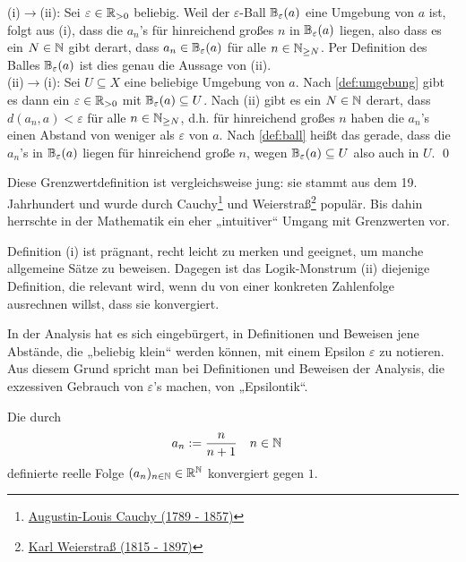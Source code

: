 \begin{bew}[*]
    (i)$\to$(ii): Sei $\varepsilon\in \mathbb R_{> 0}$ beliebig. Weil der $\varepsilon$-Ball $\mathbb B_\varepsilon(a)$ eine Umgebung von $a$ ist, folgt aus (i), dass die $a_n$'s für hinreichend großes $n$ in $\mathbb B_\varepsilon(a)$ liegen, also dass es ein $N\in \mathbb N$ gibt derart, dass $a_n\in \mathbb B_\varepsilon(a)$ für alle $n\in \mathbb N_{\ge N}$. Per Definition des Balles $\mathbb B_\varepsilon(a)$ ist dies genau die Aussage von (ii). \\[0.5em]
    (ii)$\to$(i): Sei $U\subseteq X$ eine beliebige Umgebung von $a$. Nach \cref{def:umgebung} gibt es dann ein $\varepsilon\in \mathbb R_{>0}$ mit $\mathbb B_\varepsilon(a)\subseteq U$. Nach (ii) gibt es ein $N\in \mathbb N$ derart, dass $d(a_n,a)<\varepsilon$ für alle $n\in \mathbb N_{\ge N}$, d.h. für hinreichend großes $n$ haben die $a_n$'s einen Abstand von weniger als $\varepsilon$ von $a$. Nach \cref{def:ball} heißt das gerade, dass die $a_n$'s in $\mathbb B_\varepsilon(a)$ liegen für hinreichend große $n$, wegen $\mathbb B_\varepsilon(a)\subseteq U$ also auch in $U$. \qed
\end{bew}


\begin{bem} 
    Diese Grenzwertdefinition ist vergleichsweise jung: sie stammt aus dem 19. Jahrhundert und wurde durch Cauchy\footnote{\href{https://de.wikipedia.org/wiki/Augustin-Louis_Cauchy}{Augustin-Louis Cauchy (1789 - 1857)}} und Weierstraß\footnote{\href{https://de.wikipedia.org/wiki/Karl_Weierstra\%C3\%9F}{Karl Weierstraß (1815 - 1897)}} populär. Bis dahin herrschte in der Mathematik ein eher „intuitiver“ Umgang mit Grenzwerten vor.
    
    Definition (i) ist prägnant, recht leicht zu merken und geeignet, um manche allgemeine Sätze zu beweisen. Dagegen ist das Logik-Monstrum (ii) diejenige Definition, die relevant wird, wenn du von einer konkreten Zahlenfolge ausrechnen willst, dass sie konvergiert.
    
    In der Analysis hat es sich eingebürgert, in Definitionen und Beweisen jene Abstände, die „beliebig klein“ werden können, mit einem Epsilon $\varepsilon$ zu notieren. Aus diesem Grund spricht man bei Definitionen und Beweisen der Analysis, die exzessiven Gebrauch von $\varepsilon$'s machen, von „Epsilontik“.
\end{bem}


\begin{bsp} \label{bsp:konvergenz}
    Die durch
    \begin{align*}
        a_n &:= \frac{n}{n+1} && n\in \mathbb N
    \end{align*}
    definierte reelle Folge $(a_n)_{n\in \mathbb N}\in \mathbb R^\mathbb N$ konvergiert gegen $1$.
\end{bsp}


